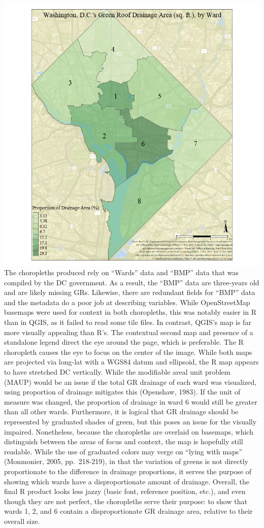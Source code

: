 \documentclass[]{article}
\begin{document}
\includegraphics[width=11.97in]{2} The choropleths produced rely on
``Wards'' data and ``BMP'' data that was compiled by the DC government.
As a result, the ``BMP'' data are three-years old and are likely missing
GRs. Likewise, there are redundant fields for ``BMP'' data and the
metadata do a poor job at describing variables. While OpenStreetMap
basemaps were used for context in both choropleths, this was notably
easier in R than in QGIS, as it failed to read some tile files. In
contrast, QGIS's map is far more visually appealing than R's. The
contextual second map and presence of a standalone legend direct the eye
around the page, which is preferable. The R choropleth causes the eye to
focus on the center of the image. While both maps are projected via
long-lat with a WGS84 datum and ellipsoid, the R map appears to have
stretched DC vertically. While the modifiable areal unit problem (MAUP)
would be an issue if the total GR drainage of each ward was visualized,
using proportion of drainage mitigates this (Openshaw, 1983). If the
unit of measure was changed, the proportion of drainage in ward 6 would
still be greater than all other wards. Furthermore, it is logical that
GR drainage should be represented by graduated shades of green, but this
poses an issue for the visually impaired. Nonetheless, because the
choropleths are overlaid on basemaps, which distinguish between the
areas of focus and context, the map is hopefully still readable. While
the use of graduated colors may verge on ``lying with maps'' (Monmonier,
2005, pp.~218-219), in that the variation of greens is not directly
proportionate to the difference in drainage proportions, it serves the
purpose of showing which wards have a disproportionate amount of
drainage. Overall, the final R product looks less jazzy (basic font,
reference position, etc.), and even though they are not perfect, the
choropleths serve their purpose: to show that wards 1, 2, and 6 contain
a disproportionate GR drainage area, relative to their overall size.
\end{document}
